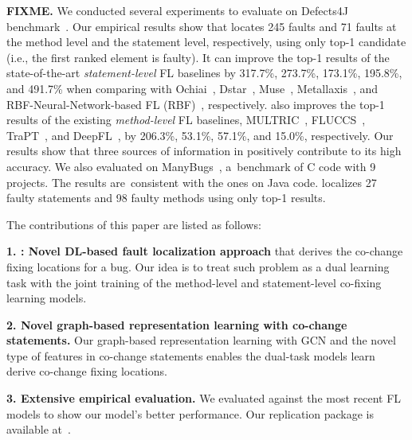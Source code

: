 {\bf FIXME.} We conducted several experiments to evaluate {\tool} on
Defects4J benchmark~\cite{defects4j}. Our empirical results show that
\tool locates 245 faults and 71 faults at the method level and the
statement level, respectively, using only top-1 candidate (i.e., the
first ranked element is faulty). It can improve the top-1 results of
the state-of-the-art \textit{statement-level} FL baselines by 317.7\%,
273.7\%, 173.1\%, 195.8\%, and 491.7\% when comparing with
Ochiai~\cite{Ochiai}, Dstar~\cite{DStar}, Muse~\cite{MUSE},
Metallaxis~\cite{Metallaxis}, and RBF-Neural-Network-based FL
(RBF)~\cite{RBF_Neural_Network}, respectively.  {\tool} also improves
the top-1 results of the existing \textit{method-level} FL baselines,
MULTRIC~\cite{MULTRIC}, FLUCCS~\cite{FLUCCS}, TraPT~\cite{TraPT}, and
DeepFL~\cite{DeepFL}, by 206.3\%, 53.1\%, 57.1\%, and 15.0\%,
respectively. Our results show that three sources of information in
{\tool} positively contribute to its high accuracy. We also evaluated
{\tool} on ManyBugs~\cite{LeGoues15tse}, a~ben\-chmark of C code with
9 projects. The results are~consistent with the ones on Java code.
{\tool} localizes 27 faulty statements and 98 faulty methods using
only top-1 results.

The contributions of this paper are listed as follows:

{\bf 1. {\tool}: Novel DL-based fault localization approach} that
derives the co-change fixing locations for a bug. Our idea is
to treat such problem as a dual learning task with the joint training
of the method-level and statement-level co-fixing learning models.

{\bf 2. Novel graph-based representation learning with co-change
  statements.} Our graph-based representation learning with GCN
and the novel type of features in co-change statements enables
the dual-task models learn derive co-change fixing locations.

{\bf 3. Extensive empirical evaluation.} We evaluated {\tool} against
the most recent FL models to show our model's better performance. Our
replication package is available at~\cite{FixLocator2022}.

